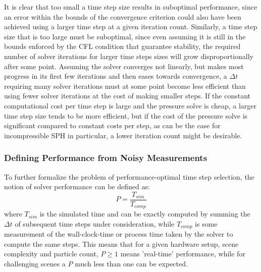 \documentclass[oneside, a4paper]{book}
\begin{document}
    It is clear that too small a time step size results in suboptimal performance, since an error within the bounds of the convergence criterion could also have been achieved using a larger time step at a given iteration count. Similarly, a time step size that is too large must be suboptimal, since even assuming it is still in the bounds enforced by the CFL condition that guarantee stability, the required number of solver iterations for larger time steps sizes will grow disproportionally after some point. Assuming the solver converges not linearly, but makes most progress in its first few iterations and then eases towards convergence, a $\Delta t$ requiring many solver iterations must at some point become less efficient than using fewer solver iterations at the cost of making smaller steps. If the constant computational cost per time step is large and the pressure solve is cheap, a larger time step size tends to be more efficient, but if the cost of the pressure solve is significant compared to constant costs per step, as can be the case for incompressible SPH in particular, a lower iteration count might be desirable.

    \subsubsection{Defining Performance from Noisy Measurements}

    To further formalize the problem of performance-optimal time step selection, the notion of solver performance can be defined as:
    \begin{equation}\label{eq:solver-performance}
      P = \frac{T_{sim}}{T_{comp}}
    \end{equation}
    where $T_{sim}$ is the simulated time and can be exactly computed by summing the $\Delta t$ of subsequent time steps under consideration, while $T_{comp}$ is some measurement of the wall-clock-time or process time taken by the solver to compute the same steps. This means that for a given hardware setup, scene complexity and particle count, $P\geq 1$ means 'real-time' performance, while for challenging scenes a $P$ much less than one can be expected.
\end{document}
